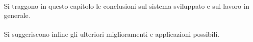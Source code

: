 {\bfseries

\paragraph{}
Si traggono in questo capitolo le conclusioni sul sistema sviluppato e sul lavoro in generale.

\paragraph{}
Si suggeriscono infine gli ulteriori miglioramenti e applicazioni possibili.
}
